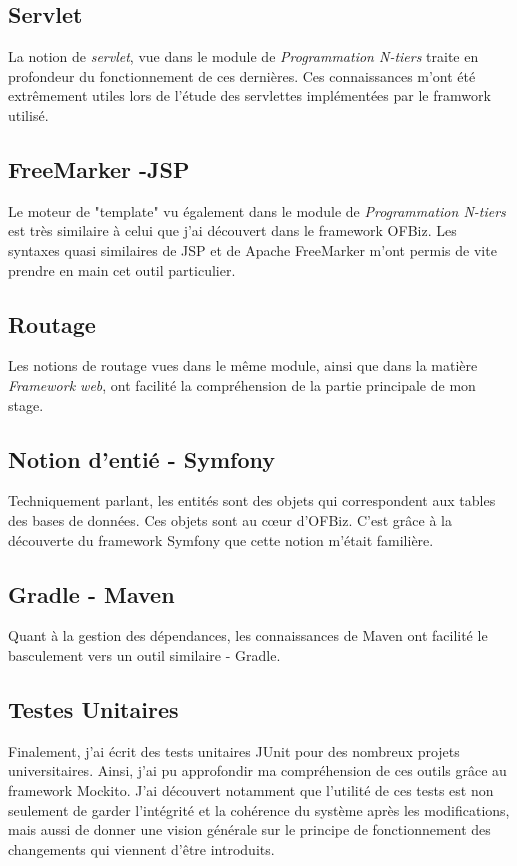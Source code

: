 \subsection{Servlet}
La notion de \emph{servlet}, vue dans le module de \emph{Programmation N-tiers} traite en profondeur du fonctionnement de ces dernières. Ces connaissances m'ont été extrêmement utiles lors de l'étude des servlettes implémentées par le framwork utilisé.   
\subsection{FreeMarker -JSP}
Le moteur de "template" vu également dans le module de \emph{Programmation N-tiers} est très similaire à celui que j'ai découvert dans le framework OFBiz. Les syntaxes quasi similaires de JSP et de Apache FreeMarker m'ont permis de vite prendre en main cet outil particulier. 
\subsection{Routage}
Les notions de routage vues dans le même module, ainsi que dans la matière \emph{Framework web}, ont facilité la compréhension de la partie principale de mon stage. 
\subsection{Notion d'entié - Symfony}
Techniquement parlant, les entités sont des objets qui correspondent aux tables des bases de données. Ces objets sont au cœur d'OFBiz. C'est grâce à la découverte du framework Symfony que cette notion m'était familière. 
\subsection{Gradle - Maven}
Quant à la gestion des dépendances, les connaissances de Maven ont facilité le basculement vers un outil similaire - Gradle. 
\subsection{Testes Unitaires}
Finalement, j'ai écrit des tests unitaires JUnit pour des nombreux projets universitaires. Ainsi, j'ai pu approfondir ma compréhension de ces outils grâce au framework Mockito. J'ai découvert notamment que l'utilité de ces tests est non seulement de garder l'intégrité et la cohérence du système après les modifications, mais aussi de donner une vision générale sur le principe de fonctionnement des changements qui viennent d'être introduits. 









